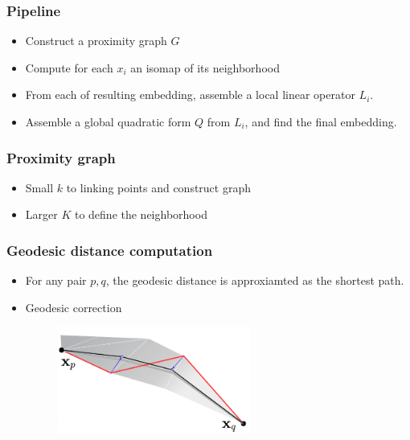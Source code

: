 \documentclass[serif,mathserif, 12pt]{beamer}
\begin{document}
\begin{frame}
  \frametitle{Pipeline}
  \begin{itemize}
  \item Construct a proximity graph $G$
  \item Compute for each $x_i$ an isomap of its neighborhood
  \item From each of resulting embedding, assemble a local linear
    operator $L_i$.
  \item Assemble a global quadratic form $Q$ from $L_i$, and
    find the final embedding.
  \end{itemize}
\end{frame}

\begin{frame}
  \frametitle{Proximity graph}
  \begin{itemize}
  \item Small $k$ to linking points and construct graph
    
  \item Larger $K$ to define the neighborhood
  \end{itemize}
\end{frame}

\begin{frame}
  \frametitle{Geodesic distance computation}
  \begin{itemize}
  \item For any pair $p, q$, the geodesic distance is approxiamted as
    the shortest path.
  \item Geodesic correction
    \begin{figure}
      \centering
      \includegraphics[width=0.6\textwidth]{img/geodesic_correction}       
    \end{figure}
  \end{itemize}
\end{frame}
\end{document}
